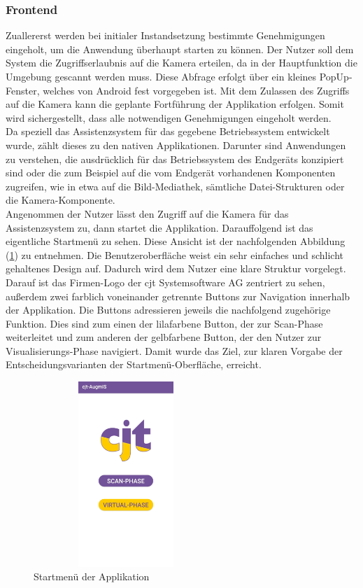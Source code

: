 \subsubsection{Frontend}
Zuallererst werden bei initialer Instandsetzung bestimmte Genehmigungen eingeholt, um die Anwendung überhaupt starten zu können. Der Nutzer soll dem System 
die Zugriffserlaubnis auf die Kamera erteilen, da in der Hauptfunktion die Umgebung gescannt werden muss. 
Diese Abfrage erfolgt über ein kleines PopUp-Fenster, welches von Android fest vorgegeben ist. 
Mit dem Zulassen des Zugriffs auf die Kamera kann die geplante Fortführung der Applikation erfolgen. Somit wird sichergestellt, dass alle notwendigen Genehmigungen 
eingeholt werden.
\\ 
\linebreak
Da speziell das Assistenzsystem für das gegebene Betriebssystem entwickelt wurde, zählt dieses zu den nativen Applikationen. 
Darunter sind Anwendungen zu verstehen, die ausdrücklich für das Betriebssystem des Endgeräts konzipiert sind oder die zum Beispiel auf die vom Endgerät vorhandenen 
Komponenten zugreifen, wie in etwa auf die Bild-Mediathek, sämtliche Datei-Strukturen oder die Kamera-Komponente.
\\ 
\linebreak
Angenommen der Nutzer lässt den Zugriff auf die Kamera für das Assistenzsystem zu, dann startet die Applikation. %
Darauffolgend ist das eigentliche Startmenü zu sehen. Diese Ansicht ist der nachfolgenden Abbildung (\ref{pic:startmenu}) zu entnehmen. Die 
Benutzeroberfläche weist ein sehr einfaches und schlicht gehaltenes Design auf. Dadurch wird dem Nutzer eine klare Struktur vorgelegt. 
Darauf ist das Firmen-Logo der cjt Systemsoftware AG zentriert zu sehen, außerdem zwei farblich voneinander getrennte Buttons zur Navigation innerhalb der Applikation. 
Die Buttons adressieren jeweils die nachfolgend zugehörige Funktion. Dies sind zum einen der lilafarbene Button, der zur Scan-Phase weiterleitet und zum anderen der 
gelbfarbene Button, der den Nutzer zur Visualisierungs-Phase navigiert. Damit wurde das Ziel, zur klaren Vorgabe der Entscheidungsvarianten der Startmenü-Oberfläche, 
erreicht.
\begin{figure}[hbt!]
    \centering
    \includegraphics[width=7cm,height=7cm,keepaspectratio]{4Umsetzung/Bilder/startmenu.jpg}
    \caption{Startmenü der Applikation}
    \label{pic:startmenu}
\end{figure}
